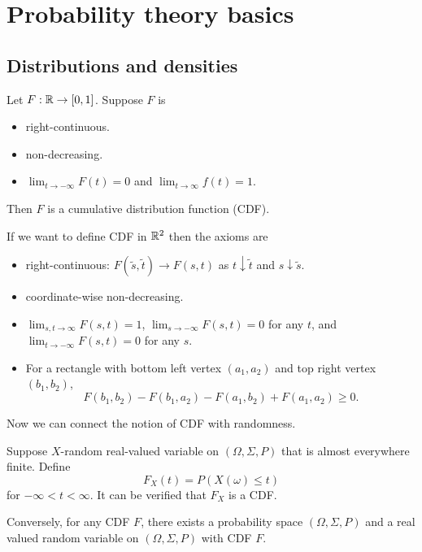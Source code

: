 \documentclass[a4paper]{article}
\begin{document}
\section{Probability theory basics}

\subsection{Distributions and densities}

\begin{defi}
  Let $F : \mathbb{R} \to [0, 1]$. Suppose $F$ is
  \begin{itemize}
    \item right-continuous.
    \item non-decreasing.
    \item $\lim_{t \to -\infty} F(t) = 0$ and
          $\lim_{t \to \infty} f(t) = 1$.
  \end{itemize}
  Then $F$ is a cumulative distribution function (CDF).
\end{defi}

\begin{remark}
  If we want to define CDF in $\mathbb{R}^2$ then the axioms are
  \begin{itemize}
    \item right-continuous: $F(\tilde{s}, \tilde{t})
            \to F(s, t)$ as $t \downarrow \tilde{t}$ and
          $s \downarrow \tilde{s}$.
    \item coordinate-wise non-decreasing.
    \item $\lim_{s, t \to \infty} F(s, t) = 1$,
          $\lim_{s \to -\infty} F(s, t) = 0$ for any $t$, and
          $\lim_{t \to - \infty} F (s, t) = 0$ for any $s$.
    \item For a rectangle with bottom left vertex $(a_1, a_2)$
          and top right vertex $(b_1, b_2)$,
          \[
            F(b_1, b_2) - F(b_1, a_2) - F(a_1, b_2) + F(a_1, a_2) \geq 0.
          \]
  \end{itemize}
\end{remark}

Now we can connect the notion of CDF with randomness.

Suppose $X$-random real-valued variable on $(\Omega, \Sigma, P)$
that is almost everywhere finite. Define
\[
  F_X (t) = P \left( X(\omega) \leq t \right)
\]
for $- \infty < t < \infty$. It can be verified that
$F_X$ is a CDF.

Conversely, for any CDF $F$, there exists a probability space
$(\Omega, \Sigma, P)$ and a real valued random variable
on $(\Omega, \Sigma, P)$ with CDF $F$.
\end{document}

